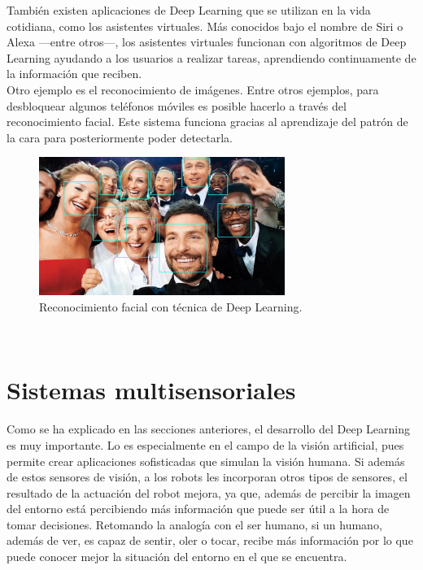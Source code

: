 También existen aplicaciones de Deep Learning que se utilizan en la vida cotidiana, como los asistentes virtuales. Más conocidos bajo el nombre de Siri o Alexa ---entre otros---, los asistentes virtuales funcionan con algoritmos de Deep Learning ayudando a los usuarios a realizar tareas, aprendiendo continuamente de la información que reciben.\\

Otro ejemplo es el reconocimiento de imágenes. Entre otros ejemplos, para desbloquear algunos teléfonos móviles es posible hacerlo a través del reconocimiento facial. Este sistema funciona gracias al aprendizaje del patrón de la cara para posteriormente poder detectarla.
\begin{figure} [h!]
  \begin{center}
    \includegraphics[width=8cm]{figs/caras}
  \end{center}
  \caption[]{Reconocimiento facial con técnica de Deep Learning. \footnotemark}
  \label{fig:visual}
\end{figure}\\

\section{Sistemas multisensoriales}
Como se ha explicado en las secciones anteriores, el desarrollo del Deep Learning es muy importante. Lo es especialmente en el campo de la visión artificial, pues permite crear aplicaciones sofisticadas que simulan la visión humana. Si además de estos sensores de visión, a los robots les incorporan otros tipos de sensores, el resultado de la actuación del robot mejora, ya que, además de percibir la imagen del entorno está percibiendo más información que puede ser útil a la hora de tomar decisiones. Retomando la analogía con el ser humano, si un humano, además de ver, es capaz de sentir, oler o tocar, recibe más información por lo que puede conocer mejor la situación del entorno en el que se encuentra.\\

